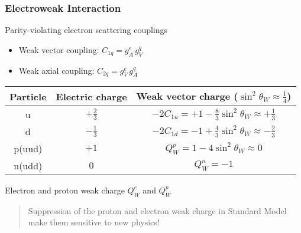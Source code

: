\begin{frame}[t]
 \frametitle{Electroweak Interaction}
 \begin{block}{Parity-violating electron scattering couplings}
  \begin{itemize}
   \item \alert{Weak vector coupling}: $C_{1q} = g^e_A \, g^q_V$
   \item Weak axial coupling: $C_{2q} = g^e_V \, g^q_A$
  \end{itemize}
  \vspace{0.5\baselineskip}
  \begin{tabular}{c|cc}
   Particle  & Electric charge & Weak vector charge ($\sin^2 \theta_W \approx \frac{1}{4}$) \\
  \hline
   u         & $+\frac{2}{3}$  & $-2 C_{1u} = +1 - \frac{8}{3} \sin^2 \theta_W \approx +\frac{1}{3}$ \\
   d         & $-\frac{1}{3}$  & $-2 C_{1d} = -1 + \frac{4}{3} \sin^2 \theta_W \approx -\frac{2}{3}$ \\
   p(uud)    & $+1$            & \alert{$Q^p_W = 1 - 4 \sin^2 \theta_W \approx 0$} \\
   n(udd)    & $0$             & $Q^n_W = -1$ \\
  \end{tabular}
 \end{block}
 \begin{block}{Electron and proton weak charge $Q^e_W$ and $Q^p_W$}
  \begin{quote}
   \alert{Suppression of the proton and electron weak charge} in Standard Model make them sensitive to new physics!
  \end{quote}
 \end{block}
\end{frame}
